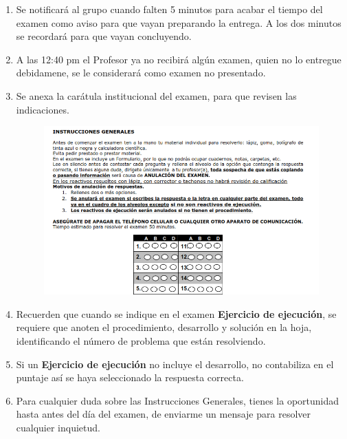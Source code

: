 \documentclass[14pt]{extarticle}
\begin{document}
\begin{enumerate}
\item Se notificará al grupo cuando falten 5 minutos para acabar el tiempo del examen como aviso para que vayan preparando la entrega. A los dos minutos se recordará para que vayan concluyendo.
\item A las 12:40 pm el Profesor ya no recibirá algún examen, quien no lo entregue debidamene, se le considerará como examen no presentado.
\item Se anexa la carátula institucional del examen, para que revisen las indicaciones.
\begin{figure}[H]
    \centering
    \includegraphics[scale=0.9]{Imagenes/Instrucciones_Examen.png}
\end{figure}
\item Recuerden que cuando se indique en el examen \textbf{Ejercicio de ejecución}, se requiere que anoten el procedimiento, desarrollo y solución en la hoja, identificando el número de problema que están resolviendo.
\item Si un \textbf{Ejercicio de ejecución} no incluye el desarrollo, no contabiliza en el puntaje así se haya seleccionado la respuesta correcta.
\item Para cualquier duda sobre las Instrucciones Generales, tienes la oportunidad hasta antes del día del examen, de enviarme un mensaje para resolver cualquier inquietud.
\end{enumerate}
\end{document}

